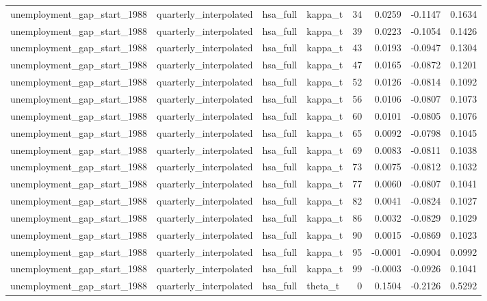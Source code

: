 \begin{tabular}{llllrrrr}
unemployment\_gap\_start\_1988 & quarterly\_interpolated & hsa\_full & kappa\_t & 34 & 0.0259 & -0.1147 & 0.1634 \\
unemployment\_gap\_start\_1988 & quarterly\_interpolated & hsa\_full & kappa\_t & 39 & 0.0223 & -0.1054 & 0.1426 \\
unemployment\_gap\_start\_1988 & quarterly\_interpolated & hsa\_full & kappa\_t & 43 & 0.0193 & -0.0947 & 0.1304 \\
unemployment\_gap\_start\_1988 & quarterly\_interpolated & hsa\_full & kappa\_t & 47 & 0.0165 & -0.0872 & 0.1201 \\
unemployment\_gap\_start\_1988 & quarterly\_interpolated & hsa\_full & kappa\_t & 52 & 0.0126 & -0.0814 & 0.1092 \\
unemployment\_gap\_start\_1988 & quarterly\_interpolated & hsa\_full & kappa\_t & 56 & 0.0106 & -0.0807 & 0.1073 \\
unemployment\_gap\_start\_1988 & quarterly\_interpolated & hsa\_full & kappa\_t & 60 & 0.0101 & -0.0805 & 0.1076 \\
unemployment\_gap\_start\_1988 & quarterly\_interpolated & hsa\_full & kappa\_t & 65 & 0.0092 & -0.0798 & 0.1045 \\
unemployment\_gap\_start\_1988 & quarterly\_interpolated & hsa\_full & kappa\_t & 69 & 0.0083 & -0.0811 & 0.1038 \\
unemployment\_gap\_start\_1988 & quarterly\_interpolated & hsa\_full & kappa\_t & 73 & 0.0075 & -0.0812 & 0.1032 \\
unemployment\_gap\_start\_1988 & quarterly\_interpolated & hsa\_full & kappa\_t & 77 & 0.0060 & -0.0807 & 0.1041 \\
unemployment\_gap\_start\_1988 & quarterly\_interpolated & hsa\_full & kappa\_t & 82 & 0.0041 & -0.0824 & 0.1027 \\
unemployment\_gap\_start\_1988 & quarterly\_interpolated & hsa\_full & kappa\_t & 86 & 0.0032 & -0.0829 & 0.1029 \\
unemployment\_gap\_start\_1988 & quarterly\_interpolated & hsa\_full & kappa\_t & 90 & 0.0015 & -0.0869 & 0.1023 \\
unemployment\_gap\_start\_1988 & quarterly\_interpolated & hsa\_full & kappa\_t & 95 & -0.0001 & -0.0904 & 0.0992 \\
unemployment\_gap\_start\_1988 & quarterly\_interpolated & hsa\_full & kappa\_t & 99 & -0.0003 & -0.0926 & 0.1041 \\
unemployment\_gap\_start\_1988 & quarterly\_interpolated & hsa\_full & theta\_t & 0 & 0.1504 & -0.2126 & 0.5292 \\

\end{tabular}
